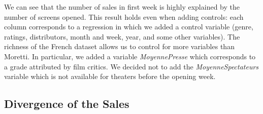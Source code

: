 We can see that the number of sales in first week is highly explained by the number of screens opened. This result holds even when adding controls: each column corresponds to a regression in which we added a control variable (genre, ratings, distributors, month and week, year, and some other variables). The richness of the French dataset allows us to control for more variables than Moretti. In particular, we added a variable \textit{MoyennePresse} which corresponds to a grade attributed by film critics. We decided not to add the \textit{MoyenneSpectateurs} variable which is not available for theaters before the opening week.

\subsection{Divergence of the Sales}\label{subsec2.2}


